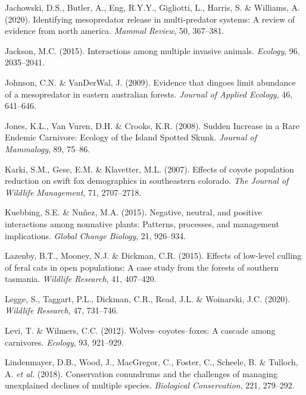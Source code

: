 \documentclass[]{elsarticle} %
\begin{document}
\leavevmode\hypertarget{ref-https:ux2fux2fdoi.orgux2f10.1111ux2fmam.12207}{}%
Jachowski, D.S., Butler, A., Eng, R.Y.Y., Gigliotti, L., Harris, S. \& Williams, A. (2020). Identifying mesopredator release in multi-predator systems: A review of evidence from north america. \emph{Mammal Review}, 50, 367--381.

\leavevmode\hypertarget{ref-jackson2015}{}%
Jackson, M.C. (2015). Interactions among multiple invasive animals. \emph{Ecology}, 96, 2035--2041.

\leavevmode\hypertarget{ref-https:ux2fux2fdoi.orgux2f10.1111ux2fj.1365-2664.2009.01650.x}{}%
Johnson, C.N. \& VanDerWal, J. (2009). Evidence that dingoes limit abundance of a mesopredator in eastern australian forests. \emph{Journal of Applied Ecology}, 46, 641--646.

\leavevmode\hypertarget{ref-jones2008sudden}{}%
Jones, K.L., Van Vuren, D.H. \& Crooks, K.R. (2008). Sudden Increase in a Rare Endemic Carnivore: Ecology of the Island Spotted Skunk. \emph{Journal of Mammalogy}, 89, 75--86.

\leavevmode\hypertarget{ref-karki2007}{}%
Karki, S.M., Gese, E.M. \& Klavetter, M.L. (2007). Effects of coyote population reduction on swift fox demographics in southeastern colorado. \emph{The Journal of Wildlife Management}, 71, 2707--2718.

\leavevmode\hypertarget{ref-kuebbing2015}{}%
Kuebbing, S.E. \& Nuñez, M.A. (2015). Negative, neutral, and positive interactions among nonnative plants: Patterns, processes, and management implications. \emph{Global Change Biology}, 21, 926--934.

\leavevmode\hypertarget{ref-lazenby2015}{}%
Lazenby, B.T., Mooney, N.J. \& Dickman, C.R. (2015). Effects of low-level culling of feral cats in open populations: A case study from the forests of southern tasmania. \emph{Wildlife Research}, 41, 407--420.

\leavevmode\hypertarget{ref-legge2020}{}%
Legge, S., Taggart, P.L., Dickman, C.R., Read, J.L. \& Woinarski, J.C. (2020). \emph{Wildlife Research}, 47, 731--746.

\leavevmode\hypertarget{ref-https:ux2fux2fdoi.orgux2f10.1890ux2f11-0165.1}{}%
Levi, T. \& Wilmers, C.C. (2012). Wolves--coyotes--foxes: A cascade among carnivores. \emph{Ecology}, 93, 921--929.

\leavevmode\hypertarget{ref-LINDENMAYER2018279}{}%
Lindenmayer, D.B., Wood, J., MacGregor, C., Foster, C., Scheele, B. \& Tulloch, A. \emph{et al.} (2018). Conservation conundrums and the challenges of managing unexplained declines of multiple species. \emph{Biological Conservation}, 221, 279--292.
\end{document}
